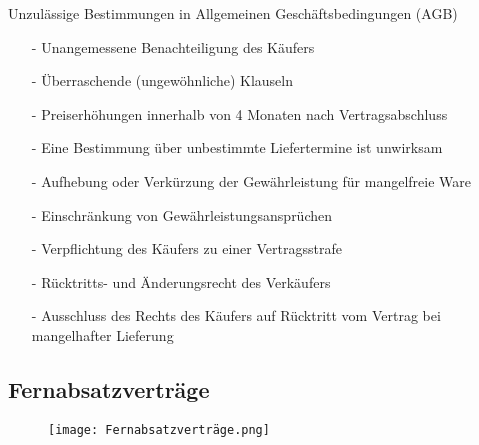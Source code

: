 \documentclass[asp1.tex]{subfiles}
\begin{document}
Unzulässige Bestimmungen in Allgemeinen Geschäftsbedingungen (AGB)
\begin{itemize}
    \item[-] Unangemessene Benachteiligung des Käufers
    \item[-]  Überraschende (ungewöhnliche) Klauseln
    \item[-]  Preiserhöhungen innerhalb von 4 Monaten nach Vertragsabschluss
    \item[-] Eine Bestimmung über unbestimmte Liefertermine ist unwirksam
    \item[-]  Aufhebung oder Verkürzung der Gewährleistung für mangelfreie Ware
    \item[-]  Einschränkung von Gewährleistungsansprüchen
    \item[-] Verpflichtung des Käufers zu einer Vertragsstrafe
    \item[-]  Rücktritts- und Änderungsrecht des Verkäufers
    \item[-]   Ausschluss des Rechts des Käufers auf Rücktritt vom Vertrag bei mangelhafter Lieferung
\end{itemize}

\subsection{Fernabsatzverträge}
\begin{figure}[H]
    \begin{center}
        \texttt{[image: Fernabsatzverträge.png]}
    \end{center}
    \label{fig:Fernabsatzverträge.png}
\end{figure}
\end{document}
